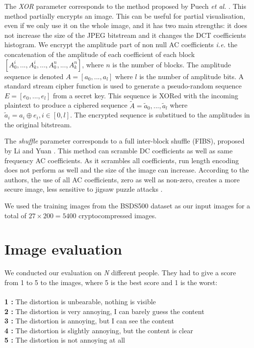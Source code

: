\documentclass{article}
\begin{document}

The \textit{XOR} parameter corresponds to the method proposed by Puech \textit{et al.} \cite{fernandez2012advanced}. This method partially encrypts an image. This can be useful for partial visualisation, even if we only use it on the whole image, and it has two main strengths: it does not increase the size of the JPEG bitstream and it changes the DCT coefficients histogram. We encrypt the amplitude part of non null AC coefficients \textit{i.e.} the concatenation of the amplitude of each coefficient of each block $[A_0^i,..., A_k^i,..., A_0^n,..., A_k^n]$, where $n$ is the number of blocks. The amplitude sequence is denoted $A = [a_0,..., a_l]$ where $l$ is the number of amplitude bits. A standard stream cipher function is used to generate a pseudo-random sequence $E = [e_0,..., e_l]$ from a secret key. This sequence is XORed with the incoming plaintext to produce a ciphered sequence $\widetilde{A} = \widetilde{a}_0,..., \widetilde{a}_l$ where $\widetilde{a}_i = a_i \oplus e_i, i \in [0,l]$. The encrypted sequence is substitued to the amplitudes in the original bitstream.

The \textit{shuffle} parameter corresponds to a full inter-block shuffle (FIBS), proposed by Li and Yuan \cite{li2007leak}. This method can scramble DC coefficients as well as same frequency AC coefficients. As it scrambles all coefficients, run length encoding does not perform as well and the size of the image can increase. According to the authors, the use of all AC coefficients, zero as well as non-zero, creates a more secure image, less sensitive to jigsaw puzzle attacks \cite{}.

We used the training images from the BSDS500 \cite{amfm_pami2011} dataset as our input images for a total of $27 \times 200 = 5400$ cryptocompressed images.


\section{Image evaluation}
\label{sec:evaluation}
We conducted our evaluation on \textit{N} different people. They had to give a score from 1 to 5 to the images, where 5 is the best score and 1 is the worst:\\\\
\textbf{1 :} The distortion is unbearable, nothing is visible\\
\textbf{2 :} \small{The distortion is very annoying, I can barely guess the content}\normalsize{}\\
\textbf{3 :} The distortion is annoying, but I can see the content\\
\textbf{4 :} The distortion is slightly annoying, but the content is clear\\
\textbf{5 :} The distortion is not annoying at all \\
\end{document}

